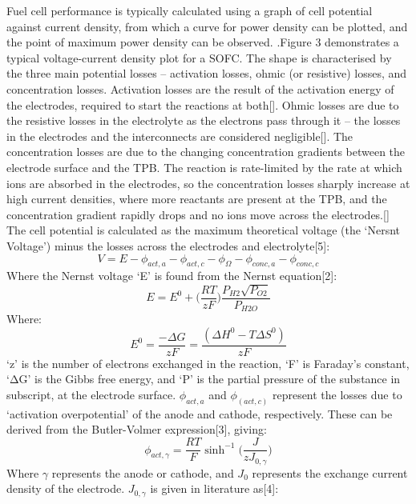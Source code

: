     Fuel cell performance is typically calculated using a graph of cell potential against current density, from which a curve for power density can be plotted, and the point of maximum power density can be observed. .Figure 3 demonstrates a typical voltage-current density plot for a SOFC. The shape is characterised by the three main potential losses – activation losses, ohmic (or resistive) losses, and concentration losses. Activation losses are the result of the activation energy of the electrodes, required to start the reactions at both[]. Ohmic losses are due to the resistive losses in the electrolyte as the electrons pass through it – the losses in the electrodes and the interconnects are considered negligible[]. The concentration losses are due to the changing concentration gradients between the electrode surface and the TPB. The reaction is rate-limited by the rate at which ions are absorbed in the electrodes, so the concentration losses sharply increase at high current densities, where more reactants are present at the TPB, and the concentration gradient rapidly drops and no ions move across the electrodes.[]
 The cell potential is calculated as the maximum theoretical voltage (the ‘Nersnt Voltage’) minus the losses across the electrodes and electrolyte[5]:
\begin{equation}
    V=E- \phi_{act,a} - \phi_{act,c}-  \phi_{\Omega}- \phi_{conc,a} -  \phi_{conc,c}			
\end{equation}
Where the Nernst voltage ‘E’ is found from the Nernst equation[2]:
\begin{equation}
E= E^0+  \Big (\frac{RT}{zF} \Big )  \frac{P_{H2} \sqrt{P_{O2} }}{P_{H2O} }				
\end{equation}
Where:				
\begin{equation}
E^0=  \frac{-\Delta G}{zF} =  \frac{(\Delta H^0-T \Delta S^0)}{zF} 						
\end{equation}
‘z’ is the number of electrons exchanged in the reaction, ‘F’ is Faraday’s constant, ‘ΔG’ is the Gibbs free energy, and ‘P’ is the partial pressure of the substance in subscript, at the electrode surface. 
$\phi_{act,a}$ and $\phi_(act,c)$ represent the losses due to ‘activation overpotential’ of the anode and cathode, respectively. These can be derived from the Butler-Volmer expression[3], giving:
\begin{equation}
\phi_{act,\gamma}=  \frac{RT}{F}   \sinh^{-1} \Big (⁡\frac{J}{zJ_{0,\gamma}} \Big )
\end{equation}
Where $\gamma$ represents the anode or cathode, and $J_{0}$ represents the exchange current density of the electrode. $J_{0,\gamma}$ is given in literature as[4]:


